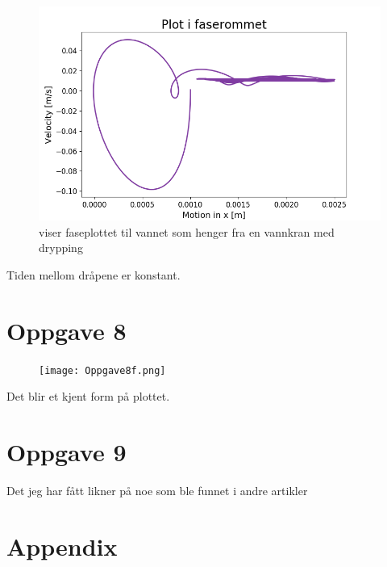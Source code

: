 \documentclass[norsk,a4paper,12pt]{article}
\begin{document}
\begin{figure}[H]
\begin{center}
\includegraphics[scale=0.5]{Oppgave7faseplott.png}
\caption{viser faseplottet til vannet som henger fra en vannkran med drypping}
\label{fig:faseplot5del2.png}
\end{center}
\end{figure}

Tiden mellom dråpene er konstant.


\section*{Oppgave 8}

\begin{figure}[H]
\begin{center}
\texttt{[image: Oppgave8f.png]}
\label{fig:faseplot5del2.png}
\end{center}
\end{figure}

Det blir et kjent form på plottet.


\section*{Oppgave 9}

Det jeg har fått likner på noe som ble funnet i andre artikler


\newpage


\section*{Appendix}
















\end{document}
